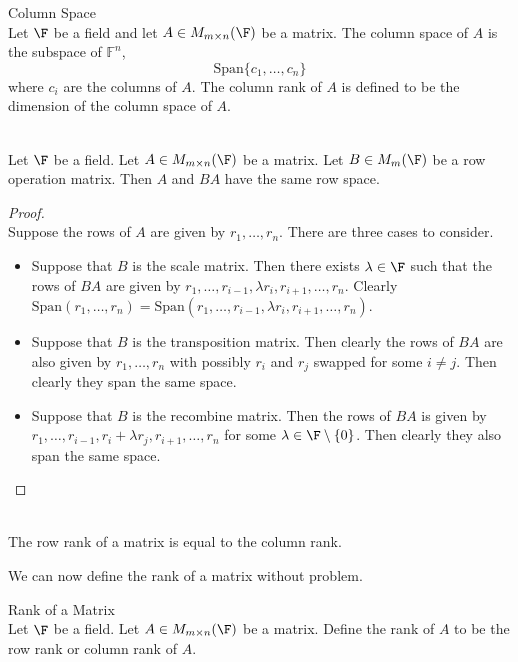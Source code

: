 \documentclass[a4paper]{article}
\begin{document}
\begin{defn}{Column Space}{}\\
Let $\F$ be a field and let $A\in M_{m\times n}(\F)$ be a matrix. The column space of $A$ is the subspace of $\mathbb{F}^n$, $$\text{Span}\{c_1,\dots,c_n\}$$ where $c_i$ are the columns of $A$. The column rank of $A$ is defined to be the dimension of the column space of $A$. 
\end{defn}

\begin{lmm}{}{}\\
Let $\F$ be a field. Let $A\in M_{m\times n}(\F)$ be a matrix. Let $B\in M_m(\F)$ be a row operation matrix. Then $A$ and $BA$ have the same row space. 
\begin{proof}\\
Suppose the rows of $A$ are given by $r_1,\dots,r_n$. There are three cases to consider. 
\begin{itemize}
\item Suppose that $B$ is the scale matrix. Then there exists $\lambda\in\F$ such that the rows of $BA$ are given by $r_1,\dots,r_{i-1},\lambda r_i,r_{i+1},\dots,r_n$. Clearly $\text{Span}(r_1,\dots,r_n)=\text{Span}(r_1,\dots,r_{i-1},\lambda r_i,r_{i+1},\dots,r_n)$. 
\item Suppose that $B$ is the transposition matrix. Then clearly the rows of $BA$ are also given by $r_1,\dots,r_n$ with possibly $r_i$ and $r_j$ swapped for some $i\neq j$. Then clearly they span the same space. 
\item Suppose that $B$ is the recombine matrix. Then the rows of $BA$ is given by $r_1,\dots,r_{i-1},r_i+\lambda r_j,r_{i+1},\dots,r_n$ for some $\lambda\in\F\setminus\{0\}$. Then clearly they also span the same space. 
\end{itemize}
\end{proof}
\end{lmm}

\begin{prp}{}{}\\
The row rank of a matrix is equal to the column rank. 
\end{prp}

We can now define the rank of a matrix without problem. 

\begin{defn}{Rank of a Matrix}{}\\
Let $\F$ be a field. Let $A\in M_{m\times n}(\F)$ be a matrix. Define the rank of $A$ to be the row rank or column rank of $A$. 
\end{defn}
\end{document}
